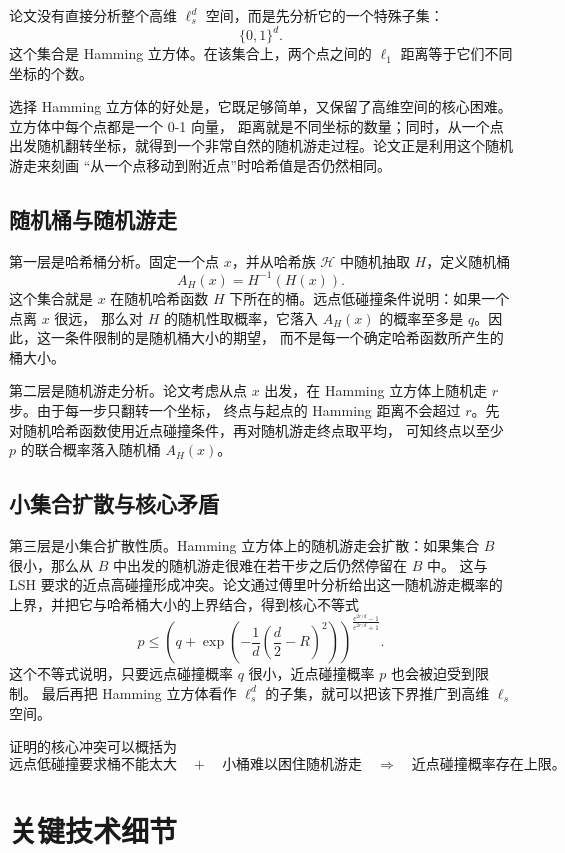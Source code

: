 \documentclass[UTF8,11pt,a4paper]{ctexart}
\begin{document}
论文没有直接分析整个高维 $\ell_s^d$ 空间，而是先分析它的一个特殊子集：
\[
  \{0,1\}^d.
\]
这个集合是 Hamming 立方体。在该集合上，两个点之间的 $\ell_1$ 距离等于它们不同坐标的个数。

选择 Hamming 立方体的好处是，它既足够简单，又保留了高维空间的核心困难。立方体中每个点都是一个 0-1 向量，
距离就是不同坐标的数量；同时，从一个点出发随机翻转坐标，就得到一个非常自然的随机游走过程。论文正是利用这个随机游走来刻画
“从一个点移动到附近点”时哈希值是否仍然相同。

\subsection{随机桶与随机游走}

第一层是哈希桶分析。固定一个点 $x$，并从哈希族 $\mathcal{H}$ 中随机抽取 $H$，定义随机桶
\[
  A_H(x)=H^{-1}(H(x)).
\]
这个集合就是 $x$ 在随机哈希函数 $H$ 下所在的桶。远点低碰撞条件说明：如果一个点离 $x$ 很远，
那么对 $H$ 的随机性取概率，它落入 $A_H(x)$ 的概率至多是 $q$。因此，这一条件限制的是随机桶大小的期望，
而不是每一个确定哈希函数所产生的桶大小。

第二层是随机游走分析。论文考虑从点 $x$ 出发，在 Hamming 立方体上随机走 $r$ 步。由于每一步只翻转一个坐标，
终点与起点的 Hamming 距离不会超过 $r$。先对随机哈希函数使用近点碰撞条件，再对随机游走终点取平均，
可知终点以至少 $p$ 的联合概率落入随机桶 $A_H(x)$。

\subsection{小集合扩散与核心矛盾}

第三层是小集合扩散性质。Hamming 立方体上的随机游走会扩散：如果集合 $B$ 很小，那么从 $B$ 中出发的随机游走很难在若干步之后仍然停留在 $B$ 中。
这与 LSH 要求的近点高碰撞形成冲突。论文通过傅里叶分析给出这一随机游走概率的上界，并把它与哈希桶大小的上界结合，得到核心不等式
\[
  p
  \le
  \left(
    q+
    \exp\left(
      -\frac{1}{d}\left(\frac{d}{2}-R\right)^2
    \right)
  \right)^{
    \frac{e^{2r/d}-1}{e^{2r/d}+1}
  }.
\]
这个不等式说明，只要远点碰撞概率 $q$ 很小，近点碰撞概率 $p$ 也会被迫受到限制。
最后再把 Hamming 立方体看作 $\ell_s^d$ 的子集，就可以把该下界推广到高维 $\ell_s$ 空间。

证明的核心冲突可以概括为
\[
  \text{远点低碰撞要求桶不能太大}
  \quad+\quad
  \text{小桶难以困住随机游走}
  \quad\Rightarrow\quad
  \text{近点碰撞概率存在上限。}
\]

\section{关键技术细节}
\end{document}
